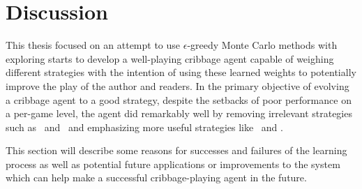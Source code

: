 \section{Discussion}
\label{sec:disc}



This thesis focused on an attempt to use
$\epsilon$-greedy Monte Carlo methods with exploring starts
to develop a well-playing
cribbage agent capable of weighing different strategies
with the intention of using these learned weights to 
potentially
improve the play of the author and readers.
%
In the primary objective of evolving a cribbage agent to a good strategy,
despite the setbacks of poor performance on a per-game level,
the agent did remarkably well
by removing irrelevant strategies
such as \handmaxmed\ and \peggingmaxmedgained\ 
and emphasizing more useful strategies
like \handmaxavg\ and \handmaxmin.

This section will describe some reasons for successes and failures of the learning
process as well as potential future applications or improvements to the
system which can help make a successful cribbage-playing agent in the future.



%





